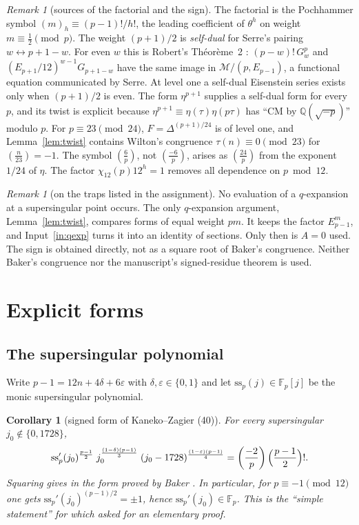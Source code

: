 \documentclass[11pt,a4paper]{article}
\numberwithin{equation}{section}
\newtheorem{corollary}[theorem]{Corollary}
\theoremstyle{definition}
\theoremstyle{remark}
\newtheorem{remark}[theorem]{Remark}
\newcommand{\Fp}{\mathbb F_p}
\newcommand{\Q}{\mathbb Q}
\newcommand{\Lp}[1]{\left(\frac{#1}{p}\right)}
\newcommand{\leg}[2]{\left(\frac{#1}{#2}\right)}
\begin{document}
\begin{remark}[sources of the factorial and the sign]\label{rem:mechanism}
The factorial is the Pochhammer symbol $(m)_h\equiv(p-1)!/h!$, the leading coefficient of
$\theta^h$ on weight $m\equiv\frac12\pmod p$. The weight $(p+1)/2$ is \emph{self-dual} for
Serre's pairing $w\leftrightarrow p+1-w$. For even $w$ this is Robert's
Th\'eor\`eme~2 \cite[\S2.5, p.~119]{Robert80}: $(p-w)!\,G_w^p$ and $(E_{p+1}/12)^{w-1}G_{p+1-w}$
have the same image in $\mathcal M/(p,E_{p-1})$, a functional equation communicated by Serre.
At level one a self-dual Eisenstein series exists only when $(p+1)/2$ is even. The form
$\eta^{p+1}$ supplies a self-dual form for every $p$, and its twist is explicit because
$\eta^{p+1}\equiv\eta(\tau)\eta(p\tau)$ has ``CM by $\Q(\sqrt{-p})$'' modulo $p$. For
$p\equiv23\pmod{24}$, $F=\Delta^{(p+1)/24}$ is of level one, and Lemma~\ref{lem:twist}
contains Wilton's congruence $\tau(n)\equiv0\pmod{23}$ for $\leg n{23}=-1$. The symbol
$\Lp6$, not $\Lp{-6}$, arises as $\leg{24}{p}$ from the exponent $1/24$ of $\eta$. The factor
$\chi_{12}(p)12^h=1$ removes all dependence on $p\bmod12$.
\end{remark}

\begin{remark}[on the traps listed in the assignment]
No evaluation of a $q$-expansion at a supersingular point occurs. The only $q$-expansion
argument, Lemma~\ref{lem:twist}, compares forms of equal weight $pm$. It keeps the factor
$E_{p-1}^m$, and Input~\ref{in:qexp} turns it into an identity of sections. Only then is
$A=0$ used. The sign is obtained directly, not as a square root of Baker's congruence.
Neither Baker's congruence nor the manuscript's signed-residue theorem is used.
\end{remark}

\section{Explicit forms}\label{sec:explicit}

\subsection{The supersingular polynomial}
Write $p-1=12n+4\delta+6\varepsilon$ with $\delta,\varepsilon\in\{0,1\}$ and let
$\mathrm{ss}_p(j)\in\Fp[j]$ be the monic supersingular polynomial.

\begin{corollary}[signed form of Kaneko--Zagier (40)]\label{cor:KZ}
For every supersingular $j_0\notin\{0,1728\}$,
\[
\mathrm{ss}_p'(j_0)^{\frac{p-1}{2}}\;j_0^{\frac{(1-\delta)(p-1)}{3}}\;(j_0-1728)^{\frac{(1-\varepsilon)(p-1)}{4}}
=\leg{-2}{p}\Bigl(\frac{p-1}2\Bigr)!.
\]
Squaring gives \cite[(40)]{KZ98} in the form proved by Baker \cite[(6.1)]{Baker98}. In
particular, for $p\equiv-1\pmod{12}$ one gets $\mathrm{ss}_p'(j_0)^{(p-1)/2}=\pm1$, hence
$\mathrm{ss}_p'(j_0)\in\Fp$. This is the ``simple statement'' for which
\cite[\S10]{KZ98} asked for an elementary proof.
\end{corollary}
\end{document}
